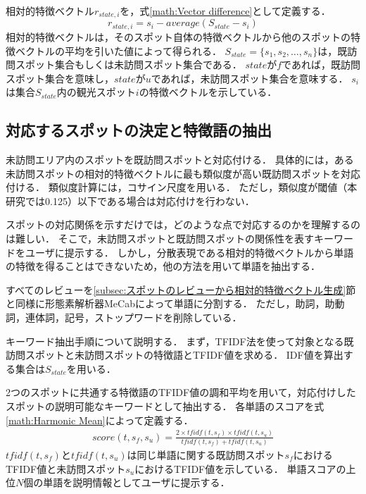 \documentclass[submit]{ipsj}
\begin{document}
相対的特徴ベクトル$r_{state,i}$を，式\ref{math:Vector difference}として定義する．
\begin{equation}
  r_{state,i}=s_i-average(S_{state}-s_i)
  \label{math:Vector difference}
\end{equation}
相対的特徴ベクトルは，そのスポット自体の特徴ベクトルから他のスポットの特徴ベクトルの平均を引いた値によって得られる．
$S_{state} =\{s_1,s_2,\dots,s_n\}$は，既訪問スポット集合もしくは未訪問スポット集合である．
$state$が$f$であれば，既訪問スポット集合を意味し，$state$が$u$であれば，未訪問スポット集合を意味する．
$s_i$は集合$S_{state}$内の観光スポット$i$の特徴ベクトルを示している．

\subsection{対応するスポットの決定と特徴語の抽出}
\label{subsec:対応するスポットの決定と特徴語の抽出}
未訪問エリア内のスポットを既訪問スポットと対応付ける．
具体的には，ある未訪問スポットの相対的特徴ベクトルに最も類似度が高い既訪問スポットを対応付ける．
類似度計算には，コサイン尺度を用いる．
ただし，類似度が閾値（本研究では0.125）以下である場合は対応付けを行わない．

スポットの対応関係を示すだけでは，どのような点で対応するのかを理解するのは難しい．
そこで，未訪問スポットと既訪問スポットの関係性を表すキーワードをユーザに提示する．
しかし，分散表現である相対的特徴ベクトルから単語の特徴を得ることはできないため，他の方法を用いて単語を抽出する．

すべてのレビューを\ref{subsec:スポットのレビューから相対的特徴ベクトル生成}節と同様に形態素解析器MeCabによって単語に分割する．
ただし，助詞，助動詞，連体詞，記号，ストップワードを削除している．

キーワード抽出手順について説明する．
まず，TFIDF法を使って対象となる既訪問スポットと未訪問スポットの特徴語とTFIDF値を求める．
IDF値を算出する集合は$S_{state}$を用いる．

2つのスポットに共通する特徴語のTFIDF値の調和平均を用いて，対応付けしたスポットの説明可能なキーワードとして抽出する．
各単語のスコアを式\ref{math:Harmonic Mean}によって定義する．
\begin{eqnarray}
  score(t,s_f,s_u) = \frac{2 \times tfidf(t,s_f) \times tfidf(t,s_u)}{tfidf(t,s_f) + tfidf(t,s_u)}
  \label{math:Harmonic Mean}
\end{eqnarray}
$tfidf(t,s_f)$と$tfidf(t,s_u)$は同じ単語に関する既訪問スポット$s_f$におけるTFIDF値と未訪問スポット$s_u$におけるTFIDF値を示している．
単語スコアの上位$N$個の単語を説明情報としてユーザに提示する．
\end{document}
